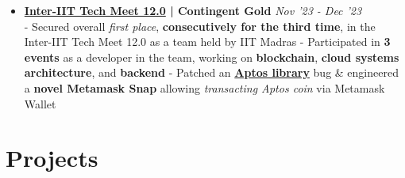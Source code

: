 \documentclass[a4paper,10pt]{extarticle} %
\begin{document}
\begin{itemize}[leftmargin=0.55cm, rightmargin=0.2cm, label={\Large\textbullet}]


 \item \textbf{\href{https://interiit-tech.org/}{Inter-IIT Tech Meet 12.0} | Contingent Gold} \hfill{\textit{Nov '23 - Dec '23}} \\
- Secured overall \textit{first place}, \textbf{consecutively for the third time}, in the Inter-IIT Tech Meet 12.0 as a team held by IIT Madras \newline
- Participated in \textbf{3 events} as a developer in the team, working on \textbf{blockchain}, \textbf{cloud systems architecture}, and \textbf{backend} \newline
- Patched an \href{https://github.com/aptos-labs/aptos-core}{\textbf{Aptos library}} bug \& engineered a \textbf{novel Metamask Snap} allowing \textit{transacting Aptos coin} via Metamask Wallet

\end{itemize}


 \vspace{0.2cm}
\section{\textcolor{primary}{Projects}}
 \vspace{0.1cm}
\end{document}

